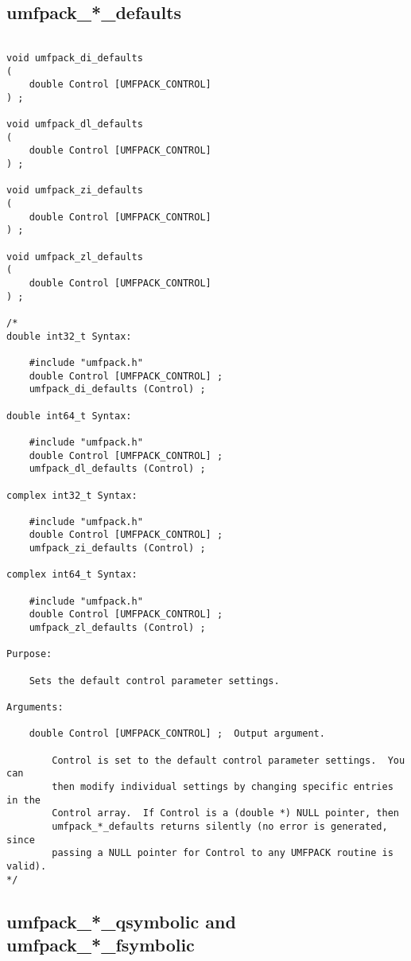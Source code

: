 \documentclass[11pt]{article}
\begin{document}
\subsection{umfpack\_*\_defaults}

{\footnotesize
\begin{verbatim}

void umfpack_di_defaults
(
    double Control [UMFPACK_CONTROL]
) ;

void umfpack_dl_defaults
(
    double Control [UMFPACK_CONTROL]
) ;

void umfpack_zi_defaults
(
    double Control [UMFPACK_CONTROL]
) ;

void umfpack_zl_defaults
(
    double Control [UMFPACK_CONTROL]
) ;

/*
double int32_t Syntax:

    #include "umfpack.h"
    double Control [UMFPACK_CONTROL] ;
    umfpack_di_defaults (Control) ;

double int64_t Syntax:

    #include "umfpack.h"
    double Control [UMFPACK_CONTROL] ;
    umfpack_dl_defaults (Control) ;

complex int32_t Syntax:

    #include "umfpack.h"
    double Control [UMFPACK_CONTROL] ;
    umfpack_zi_defaults (Control) ;

complex int64_t Syntax:

    #include "umfpack.h"
    double Control [UMFPACK_CONTROL] ;
    umfpack_zl_defaults (Control) ;

Purpose:

    Sets the default control parameter settings.

Arguments:

    double Control [UMFPACK_CONTROL] ;  Output argument.

        Control is set to the default control parameter settings.  You can
        then modify individual settings by changing specific entries in the
        Control array.  If Control is a (double *) NULL pointer, then
        umfpack_*_defaults returns silently (no error is generated, since
        passing a NULL pointer for Control to any UMFPACK routine is valid).
*/
\end{verbatim}
}

\newpage
\subsection{umfpack\_*\_qsymbolic and umfpack\_*\_fsymbolic}
\end{document}
